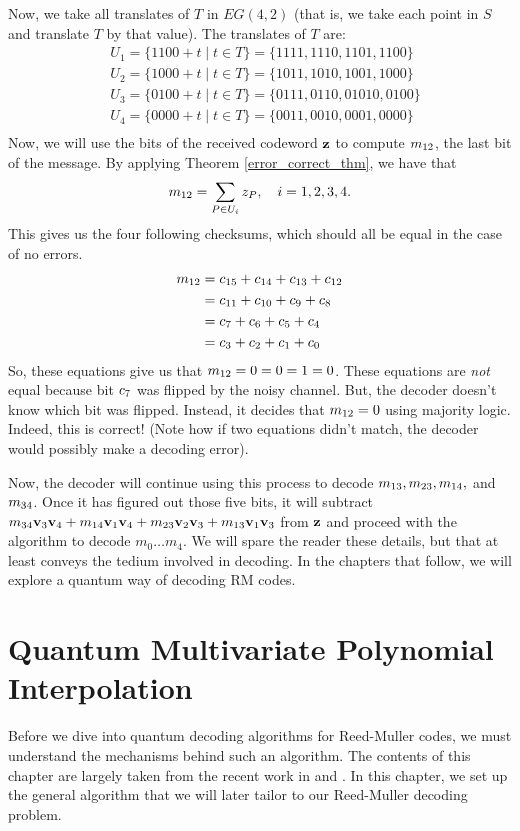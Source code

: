 \documentclass[12pt,twoside]{reedthesis}
\theoremstyle{definition}
\begin{document}
Now, we take all translates of $T$ in $EG(4,2)$ (that is, we take each point in $S$ and translate $T$ by that value). The translates of $T$ are: 
\begin{align*}
& U_1 =  \{1100 + t \mid t \in T\} = \{1111, 1110, 1101, 1100\} \\
& U_2 = \{1000 + t \mid t \in T\} = \{1011, 1010, 1001, 1000\} \\
& U_3 = \{0100 + t \mid t \in T\} = \{0111, 0110, 01010, 0100\} \\
& U_4 =  \{0000 + t \mid t \in T\} = \{0011, 0010, 0001, 0000\} \\
\end{align*}
Now, we will use the bits of the received codeword $\mathbf{z}$ to compute $m_{12}$, the last bit of the message. By applying Theorem \ref{error_correct_thm}, we have that 
\begin{equation*}
m_{12}  = \sum_{P \in U_i} z_{P}, \quad i = 1,2,3,4. 
\end{equation*}
This gives us the four following checksums, which should all be equal in the case of no errors.
\begin{align*}
m_{12} 
& = c_{15} + c_{14} + c_{13} + c_{12}\\
& = c_{11} + c_{10} + c_{9} + c_{8}\\
& = c_{7} + c_{6} + c_{5} + c_{4} \\
& = c_{3} + c_{2} + c_{1} + c_{0}
\end{align*}
So, these equations give us that $m_{12} =0 =0=1=0 $. These equations are \textit{not} equal because bit $c_{7}$ was flipped by the noisy channel. But, the decoder doesn't know which bit was flipped. Instead, it decides that $m_{12} = 0$ using majority logic. Indeed, this is correct! (Note how if two equations didn't match, the decoder would possibly make a decoding error).

Now, the decoder will continue using this process to decode $m_{13}, m_{23}, m_{14}, $ and $m_{34}$. Once it has figured out those five bits, it will subtract $m_{34}\mathbf{v}_{3}\mathbf{v}_{4} + m_{14}\mathbf{v}_{1}\mathbf{v}_{4} + m_{23}\mathbf{v}_{2}\mathbf{v}_{3} + m_{13}\mathbf{v}_{1}\mathbf{v}_{3}$ from $\mathbf{z}$ and proceed with the algorithm to decode $m_0 \ldots m_4$. We will spare the reader these details, but that at least conveys the tedium involved in decoding. In the chapters that follow, we will explore a quantum way of decoding RM codes.

\chapter{Quantum Multivariate Polynomial Interpolation}
Before we dive into quantum decoding algorithms for Reed-Muller codes, we must understand the mechanisms behind such an algorithm. The contents of this chapter are largely taken from the recent work in \citep{chen2018quantum} and \citep{childs2015optimal}. In this chapter, we set up the general algorithm that we will later tailor to our Reed-Muller decoding problem. 
\end{document}
